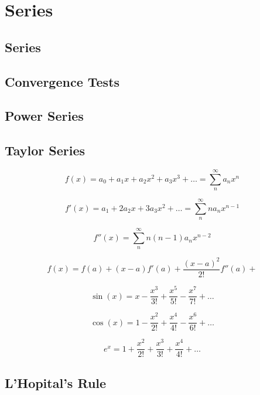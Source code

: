 \chapter{Series}

\section{Series}
\section{Convergence Tests}
\section{Power Series}

\section{Taylor Series}

\begin{equation*}
    f(x) = a_0 + a_1 x + a_2 x^2 + a_3 x^3 + \dots = \sum_{n}^{\infty}a_n x^n
\end{equation*}

\begin{equation*}
    f'(x) = a_1 + 2a_2 x + 3a_3 x^2 + \dots = \sum_{n}^{\infty}n a_n x^{n-1}
\end{equation*}

\begin{equation*}
    f''(x) = \sum_{n}^{\infty} n(n-1) a_n x^{n-2}
\end{equation*}

\begin{equation*}
    f(x) = f(a) + (x-a)f'(a) + \frac{(x-a)^2}{2!}f''(a) + 
\end{equation*}

\begin{equation*}
    \sin(x) = x - \frac{x^{3}}{3!} + \frac{x^{5}}{5!} - \frac{x^{7}}{7!} + \dots
\end{equation*}

\begin{equation*}
    \cos(x) = 1 - \frac{x^{2}}{2!} + \frac{x^{4}}{4!} - \frac{x^{6}}{6!} + \dots
\end{equation*}

\begin{equation*}
    e^{x} = 1 + \frac{x^{2}}{2!} + \frac{x^{3}}{3!} + \frac{x^{4}}{4!} + \dots
\end{equation*}

\section{L’Hopital's Rule}